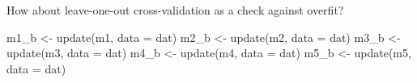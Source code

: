 \documentclass[
  ignorenonframetext,
]{beamer}
\newenvironment{Shaded}{\begin{snugshade}}{\end{snugshade}}
\newcommand{\AttributeTok}[1]{\textcolor[rgb]{0.77,0.63,0.00}{#1}}
\newcommand{\FunctionTok}[1]{\textcolor[rgb]{0.00,0.00,0.00}{#1}}
\newcommand{\NormalTok}[1]{#1}
\newcommand{\OtherTok}[1]{\textcolor[rgb]{0.56,0.35,0.01}{#1}}
\begin{document}
\begin{frame}[fragile]{}
\protect\hypertarget{section-26}{}
How about leave-one-out cross-validation as a check against overfit?

\vspace{12pt}
\tiny

\begin{Shaded}
\begin{Highlighting}[]
\NormalTok{m1\_b }\OtherTok{\textless{}{-}} \FunctionTok{update}\NormalTok{(m1, }\AttributeTok{data =}\NormalTok{ dat)}
\NormalTok{m2\_b }\OtherTok{\textless{}{-}} \FunctionTok{update}\NormalTok{(m2, }\AttributeTok{data =}\NormalTok{ dat)}
\NormalTok{m3\_b }\OtherTok{\textless{}{-}} \FunctionTok{update}\NormalTok{(m3, }\AttributeTok{data =}\NormalTok{ dat)}
\NormalTok{m4\_b }\OtherTok{\textless{}{-}} \FunctionTok{update}\NormalTok{(m4, }\AttributeTok{data =}\NormalTok{ dat)}
\NormalTok{m5\_b }\OtherTok{\textless{}{-}} \FunctionTok{update}\NormalTok{(m5, }\AttributeTok{data =}\NormalTok{ dat)}


\end{Highlighting}
\end{Shaded}
\end{frame}
\end{document}
